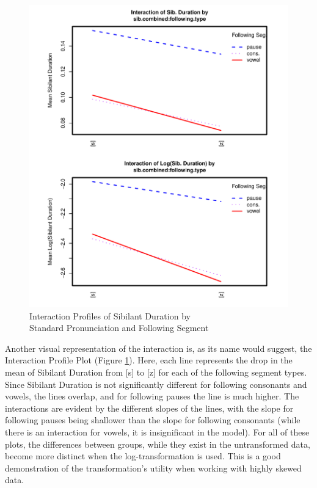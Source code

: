\documentclass[a4paper]{article}
\begin{document}
\begin{figure}[h!]
  \begin{center}
    \begin{minipage}[t]{\linewidth}
      \begin{center}
\includegraphics{prelim-063}
      \end{center}
    \end{minipage}
    \caption{Interaction Profiles of Sibilant Duration by\\ Standard Pronunciation
      and Following Segment}
    \label{fig:sib.dur.int}
  \end{center}
\end{figure}
Another visual representation of the interaction is, as its name would
suggest, the Interaction Profile Plot (Figure \ref{fig:sib.dur.int}).  Here,
each line represents the drop in the mean of
Sibilant Duration from [s] to [z] for each of the following segment
types.  Since Sibilant Duration is not significantly different for
following consonants and vowels, the lines overlap, and for
following pauses the line is  much higher.  The interactions are evident
by the different slopes of the lines, with the slope for
following pauses being shallower than the slope for following consonants
(while there is an interaction for vowels, it is insignificant in the
model).
\newpage
For all of these plots, the differences between groups, while they
exist in the untransformed data, become more
distinct when the log-transformation is used.  This is a good demonstration
of the transformation's utility when working with highly skewed data.
\end{document}
